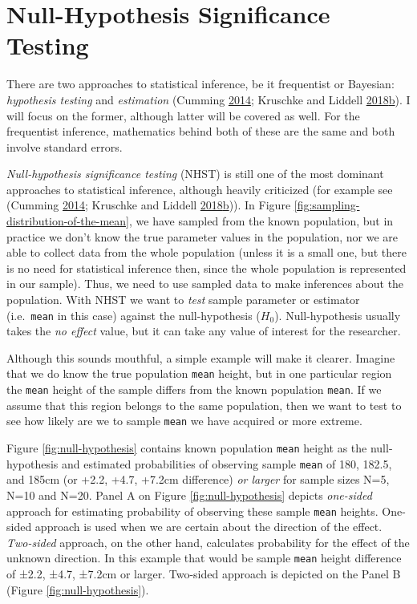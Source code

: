 \documentclass[
]{book}
\begin{document}
\hypertarget{null-hypothesis-significance-testing}{%
\section{Null-Hypothesis Significance Testing}\label{null-hypothesis-significance-testing}}

There are two approaches to statistical inference, be it frequentist or Bayesian: \emph{hypothesis testing} and \emph{estimation} (Cumming \protect\hyperlink{ref-cummingNewStatisticsWhy2014}{2014}; Kruschke and Liddell \protect\hyperlink{ref-kruschkeBayesianNewStatistics2018}{2018}\protect\hyperlink{ref-kruschkeBayesianNewStatistics2018}{b}). I will focus on the former, although latter will be covered as well. For the frequentist inference, mathematics behind both of these are the same and both involve standard errors.

\emph{Null-hypothesis significance testing} (NHST) is still one of the most dominant approaches to statistical inference, although heavily criticized (for example see (Cumming \protect\hyperlink{ref-cummingNewStatisticsWhy2014}{2014}; Kruschke and Liddell \protect\hyperlink{ref-kruschkeBayesianNewStatistics2018}{2018}\protect\hyperlink{ref-kruschkeBayesianNewStatistics2018}{b})). In Figure \ref{fig:sampling-distribution-of-the-mean}, we have sampled from the known population, but in practice we don't know the true parameter values in the population, nor we are able to collect data from the whole population (unless it is a small one, but there is no need for statistical inference then, since the whole population is represented in our sample). Thus, we need to use sampled data to make inferences about the population. With NHST we want to \emph{test} sample parameter or estimator (i.e.~\texttt{mean} in this case) against the null-hypothesis (\(H_{0}\)). Null-hypothesis usually takes the \emph{no effect} value, but it can take any value of interest for the researcher.

Although this sounds mouthful, a simple example will make it clearer. Imagine that we do know the true population \texttt{mean} height, but in one particular region the \texttt{mean} height of the sample differs from the known population \texttt{mean}. If we assume that this region belongs to the same population, then we want to test to see how likely are we to sample \texttt{mean} we have acquired or more extreme.

Figure \ref{fig:null-hypothesis} contains known population \texttt{mean} height as the null-hypothesis and estimated probabilities of observing sample \texttt{mean} of 180, 182.5, and 185cm (or +2.2, +4.7, +7.2cm difference) \emph{or larger} for sample sizes N=5, N=10 and N=20. Panel A on Figure \ref{fig:null-hypothesis} depicts \emph{one-sided} approach for estimating probability of observing these sample \texttt{mean} heights. One-sided approach is used when we are certain about the direction of the effect. \emph{Two-sided} approach, on the other hand, calculates probability for the effect of the unknown direction. In this example that would be sample \texttt{mean} height difference of ±2.2, ±4.7, ±7.2cm or larger. Two-sided approach is depicted on the Panel B (Figure \ref{fig:null-hypothesis}).
\end{document}
